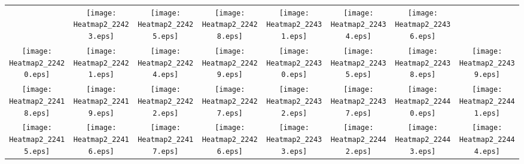 \documentclass{standalone}
\begin{document}
\renewcommand{\arraystretch}{0}
\setlength{\tabcolsep}{0pt}
\begin{tabular}{ *8{c} }
 & \texttt{[image: Heatmap2\_22423.eps]} & \texttt{[image: Heatmap2\_22425.eps]} & \texttt{[image: Heatmap2\_22428.eps]} & \texttt{[image: Heatmap2\_22431.eps]} & \texttt{[image: Heatmap2\_22434.eps]} & \texttt{[image: Heatmap2\_22436.eps]} &  \\
\texttt{[image: Heatmap2\_22420.eps]} & \texttt{[image: Heatmap2\_22421.eps]} & \texttt{[image: Heatmap2\_22424.eps]} & \texttt{[image: Heatmap2\_22429.eps]} & \texttt{[image: Heatmap2\_22430.eps]} & \texttt{[image: Heatmap2\_22435.eps]} & \texttt{[image: Heatmap2\_22438.eps]} & \texttt{[image: Heatmap2\_22439.eps]} \\
\texttt{[image: Heatmap2\_22418.eps]} & \texttt{[image: Heatmap2\_22419.eps]} & \texttt{[image: Heatmap2\_22422.eps]} & \texttt{[image: Heatmap2\_22427.eps]} & \texttt{[image: Heatmap2\_22432.eps]} & \texttt{[image: Heatmap2\_22437.eps]} & \texttt{[image: Heatmap2\_22440.eps]} & \texttt{[image: Heatmap2\_22441.eps]} \\
\texttt{[image: Heatmap2\_22415.eps]} & \texttt{[image: Heatmap2\_22416.eps]} & \texttt{[image: Heatmap2\_22417.eps]} & \texttt{[image: Heatmap2\_22426.eps]} & \texttt{[image: Heatmap2\_22433.eps]} & \texttt{[image: Heatmap2\_22442.eps]} & \texttt{[image: Heatmap2\_22443.eps]} & \texttt{[image: Heatmap2\_22444.eps]} \\

\end{tabular}
\end{document}

